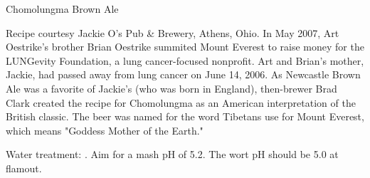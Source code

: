 \stylesection{\stylealternativesugarbeer}

\begin{recipe}{Chomolungma Brown Ale}

\begin{aboutblock}
Recipe courtesy Jackie O's Pub \& Brewery, Athens, Ohio.
In May 2007, Art Oestrike's brother Brian Oestrike summited Mount Everest
to raise money for the LUNG\-evity Foundation, a lung cancer-focused nonprofit.
Art and Brian's mother, Jackie, had passed away from lung cancer on June 14, 2006.
As Newcastle Brown Ale was a favorite of Jackie's (who was born in England),
then-brewer Brad Clark created the recipe for Chomolungma as an American
interpretation of the British classic. The beer was named for the word Tibetans
use for Mount Everest, which means "Goddess Mother of the Earth."
\end{aboutblock}


\begin{methodandtiming}
 
\begin{mashsteps}
\end{mashsteps}

\begin{fermentationsteps}
\end{fermentationsteps}

\begin{directions}
Water treatment: . Aim for a mash pH of 5.2.
The wort pH should be 5.0 at flamout. 
\end{directions}

\end{methodandtiming}

\recipebreak

\begin{ingredientsblock}

\begin{malts}
\end{malts}


\end{ingredientsblock}
\end{recipe}
